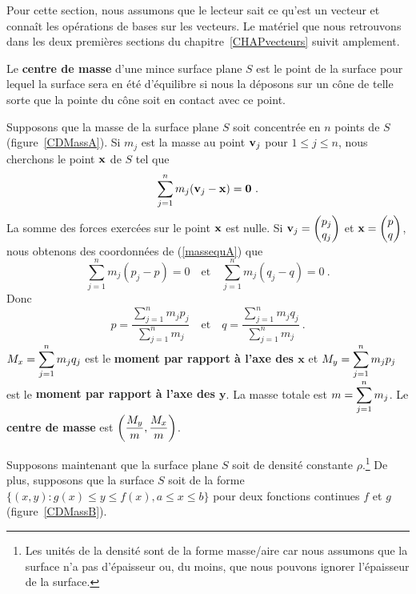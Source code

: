 {Pour cette section, nous assumons que le lecteur sait ce qu'est un vecteur
et connaît les opérations de bases sur les vecteurs.  Le matériel que
nous retrouvons dans les deux premières sections du
chapitre~\ref{CHAPvecteurs} suivit amplement.

Le {\bfseries centre de masse} d'une mince
surface plane $S$ est le point de la surface pour lequel la surface
sera en été d'équilibre si nous la déposons sur un cône de telle sorte que
la pointe du cône soit en contact avec ce point.  


Supposons que la masse de la surface plane $S$ soit concentrée en $n$ points
de $S$ (figure~\ref{CDMassA}).  Si $m_j$ est la masse au point
$\mathbf{v}_j$ pour $1\leq j \leq n$, nous cherchons le point $\mathbf{x}$
de $S$ tel que
\begin{equation} \label{massequA}
\sum_{j=1}^n m_j(\mathbf{v}_j-\mathbf{x}) = \mathbf{0} \ .
\end{equation}
La somme des forces exercées sur le point $\mathbf{x}$ est nulle.  Si
$\displaystyle \mathbf{v}_j = \begin{pmatrix} p_j \\ q_j \end{pmatrix}$ et
$\mathbf{x} = \begin{pmatrix} p \\ q \end{pmatrix}$, nous obtenons des coordonnées
de (\ref{massequA}) que
\[
\sum_{j=1}^n m_j (p_j - p) = 0 \quad \text{et} \quad
\sum_{j=1}^n m_j (q_j - q) = 0 \ .
\]
Donc
\[
p = \frac{\sum_{j=1}^n m_j p_j}{\sum_{j=1}^n m_j} \quad \text{et} \quad
q = \frac{\sum_{j=1}^n m_j q_j}{\sum_{j=1}^n m_j} \ .
\]
$\displaystyle M_x = \sum_{j=1}^n m_j q_j$ est le
{\bfseries moment par rapport à l'axe des $\mathbf x$}
et $\displaystyle M_y = \sum_{j=1}^n m_j p_j$ est le
{\bfseries moment par rapport à l'axe des $\mathbf y$}.  La masse totale est
$\displaystyle m = \sum_{j=1}^n m_j$.  Le
{\bfseries centre de masse} est
$\displaystyle \left( \frac{M_y}{m} , \frac{M_x}{m}\right)$.

Supposons maintenant que la surface plane $S$ soit de densité
constante $\rho$.\footnote{Les unités de la densité sont de la forme
masse/aire car nous assumons que la surface n'a pas d'épaisseur ou, du
moins, que nous pouvons ignorer l'épaisseur de la surface.}
De plus, supposons que la surface $S$ soit de la forme
$\{ (x,y) : g(x) \leq y \leq f(x) , a \leq x \leq b\}$ pour deux
fonctions continues $f$ et $g$ (figure~\ref{CDMassB}).

}
